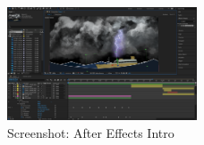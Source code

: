 \begin{figure}
\includegraphics[width=0.5\textwidth]{../img/screenshot_aftereffects_intro.PNG}
\caption{Screenshot: After Effects Intro}
\label{fig:Screenshot: After Effects Intro}
\end{figure}